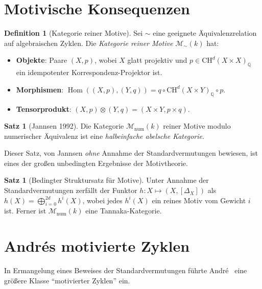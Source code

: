 \documentclass[12pt,a4paper]{amsart}
\theoremstyle{definition}
\newtheorem{satz}[theorem]{Satz}
\newtheorem{definition_de}[theorem]{Definition}
\newcommand{\Q}{\mathbb{Q}}
\DeclareMathOperator{\Hom}{Hom}
\newcommand{\CH}{\mathrm{CH}}
\begin{document}
\section{Motivische Konsequenzen}\label{sec:motive}

\begin{definition_de}[Kategorie reiner Motive]
Sei $\sim$ eine geeignete Äquivalenzrelation auf algebraischen Zyklen.
Die \emph{Kategorie reiner Motive} $\mathcal{M}_\sim(k)$ hat:
\begin{itemize}
  \item \textbf{Objekte}: Paare $(X, p)$, wobei $X$ glatt projektiv und
        $p \in \CH^d(X \times X)_\Q$ ein idempotenter Korrespondenz-Projektor ist.
  \item \textbf{Morphismen}: $\Hom((X,p),(Y,q)) = q \circ \CH^d(X \times Y)_\Q \circ p$.
  \item \textbf{Tensorprodukt}: $(X,p) \otimes (Y,q) = (X \times Y, p \times q)$.
\end{itemize}
\end{definition_de}

\begin{satz}[Jannsen 1992]\label{satz:jannsen}
Die Kategorie $\mathcal{M}_{\mathrm{num}}(k)$ reiner Motive modulo numerischer
Äquivalenz ist eine \emph{halbeinfache abelsche Kategorie}.
\end{satz}

Dieser Satz, von Jannsen \emph{ohne} Annahme der Standardvermutungen bewiesen,
ist eines der großen unbedingten Ergebnisse der Motivtheorie.

\begin{satz}[Bedingter Struktursatz für Motive]
Unter Annahme der Standardvermutungen zerfällt der Funktor
$h: X \mapsto (X, [\Delta_X])$ als
$h(X) = \bigoplus_{i=0}^{2d} h^i(X)$,
wobei jedes $h^i(X)$ ein reines Motiv vom Gewicht $i$ ist.
Ferner ist $\mathcal{M}_{\mathrm{num}}(k)$ eine Tannaka-Kategorie.
\end{satz}

\section{Andrés motivierte Zyklen}\label{sec:andre}

In Ermangelung eines Beweises der Standardvermutungen führte
Andr\'e~\cite{andre1996} eine größere Klasse ``motivierter Zyklen'' ein.
\end{document}
